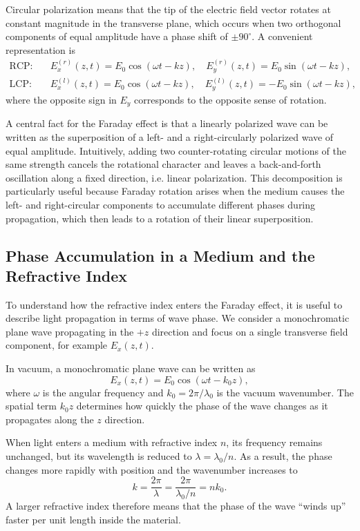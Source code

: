 \documentclass[a4paper]{article}
\begin{document}
Circular polarization means that the tip of the electric field vector rotates at constant magnitude in the transverse plane, which occurs when two orthogonal components of equal amplitude have a phase shift of $\pm 90^\circ$.
A convenient representation is
\begin{align*}
  \text{RCP:}\quad &E_x^{(r)}(z,t)=E_0\cos(\omega t-kz),\quad E_y^{(r)}(z,t)=E_0\sin(\omega t-kz), \\
  \text{LCP:}\quad &E_x^{(l)}(z,t)=E_0\cos(\omega t-kz),\quad E_y^{(l)}(z,t)=-E_0\sin(\omega t-kz),
\end{align*}
where the opposite sign in $E_y$ corresponds to the opposite sense of rotation.

A central fact for the Faraday effect is that a linearly polarized wave can be written as the superposition of a left- and a right-circularly polarized wave of equal amplitude.
Intuitively, adding two counter-rotating circular motions of the same strength cancels the rotational character and leaves a back-and-forth oscillation along a fixed direction, i.e. linear polarization.
This decomposition is particularly useful because Faraday rotation arises when the medium causes the left- and right-circular components to accumulate different phases during propagation, which then leads to a rotation of their linear superposition.

\subsection{Phase Accumulation in a Medium and the Refractive Index}

To understand how the refractive index enters the Faraday effect, it is useful to describe light propagation in terms of wave phase.
We consider a monochromatic plane wave propagating in the $+z$ direction and focus on a single transverse field component, for example $E_x(z,t)$.

In vacuum, a monochromatic plane wave can be written as
\[
  E_x(z,t) = E_0 \cos(\omega t - k_0 z),
\]
where $\omega$ is the angular frequency and $k_0 = 2\pi / \lambda_0$ is the vacuum wavenumber.
The spatial term $k_0 z$ determines how quickly the phase of the wave changes as it propagates along the $z$ direction.

When light enters a medium with refractive index $n$, its frequency remains unchanged, but its wavelength is reduced to $\lambda = \lambda_0 / n$.
As a result, the phase changes more rapidly with position and the wavenumber increases to
\[
  k = \frac{2\pi}{\lambda} = \frac{2\pi}{\lambda_0 / n} = n k_0.
\]
A larger refractive index therefore means that the phase of the wave ``winds up'' faster per unit length inside the material.
\end{document}
